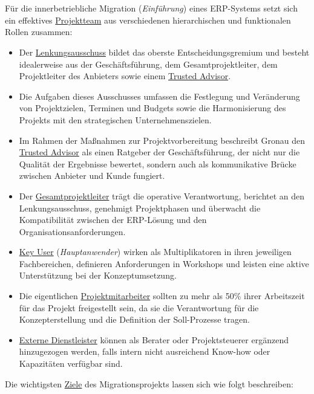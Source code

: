 \section{ } \par Für die innerbetriebliche Migration (\textit{Einführung}) eines \acs{ERP}-Systems setzt sich ein effektives \uline{Projektteam} aus verschiedenen hierarchischen und funktionalen Rollen zusammen:
\begin{itemize}
    \item Der \uline{Lenkungsausschuss} bildet das oberste Entscheidungsgremium und besteht idealerweise aus der Geschäftsführung, dem Gesamtprojektleiter, dem Projektleiter des Anbieters sowie einem \uline{Trusted Advisor}.
    \item Die Aufgaben dieses Ausschusses umfassen die Festlegung und Veränderung von Projektzielen, Terminen und Budgets sowie die Harmonisierung des Projekts mit den strategischen Unternehmenszielen.
    \item Im Rahmen der Maßnahmen zur Projektvorbereitung beschreibt Gronau \cite[308]{4} den \uline{Trusted Advisor} als einen Ratgeber der Geschäftsführung, der nicht nur die Qualität der Ergebnisse bewertet, sondern auch als kommunikative Brücke zwischen Anbieter und Kunde fungiert.
    \item Der \uline{Gesamtprojektleiter} trägt die operative Verantwortung, berichtet an den Lenkungsausschuss, genehmigt Projektphasen und überwacht die Kompatibilität zwischen der \acs{ERP}-Lösung und den Organisationsanforderungen.
    \item \uline{Key User} (\textit{Hauptanwender}) wirken als Multiplikatoren in ihren jeweiligen Fachbereichen, definieren Anforderungen in Workshops und leisten eine aktive Unterstützung bei der Konzeptumsetzung.
    \item Die eigentlichen \uline{Projektmitarbeiter} sollten zu mehr als 50\% ihrer Arbeitszeit für das Projekt freigestellt sein, da sie die Verantwortung für die Konzepterstellung und die Definition der Soll-Prozesse tragen.
    \item \uline{Externe Dienstleister} können als Berater oder Projektsteuerer ergänzend hinzugezogen werden, falls intern nicht ausreichend Know-how oder Kapazitäten verfügbar sind.
\end{itemize}
Die wichtigsten \uline{Ziele} des Migrationsprojekts lassen sich wie folgt beschreiben:
